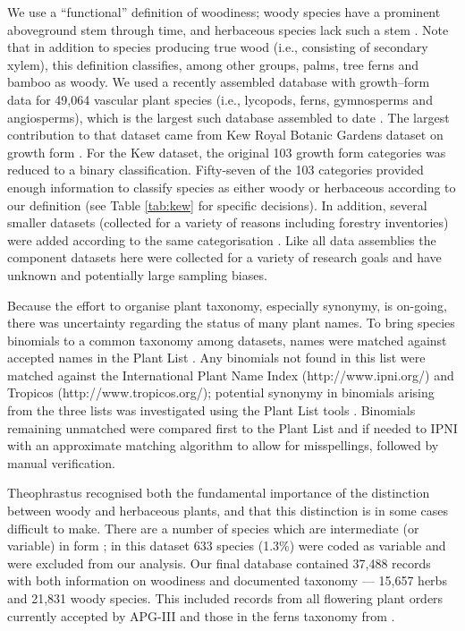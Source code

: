 \documentclass[a4paper,12pt]{article}
\begin{document}
We use a ``functional'' definition of woodiness; woody species have a
prominent aboveground stem through time, and herbaceous species lack
such a stem \citep[see an early use of this definition
by][]{gray1887elements}.  Note that in addition to species producing
true wood (i.e., consisting of secondary xylem), this definition
classifies, among other groups, palms, tree ferns and bamboo as
woody.
%
We used a recently assembled database with growth--form data for 49,064
vascular plant species (i.e., lycopods, ferns,
gymnosperms and angiosperms), which is the largest such database assembled
to date \citep{Zanne}. 
%
The largest contribution to that dataset came from Kew Royal Botanic
Gardens dataset on growth form \citep{Kew}.  For the Kew dataset, the
original 103 growth form categories was reduced to a binary
classification.  Fifty-seven of the 103 categories provided enough
information to classify species as either woody or herbaceous
according to our definition (see Table \ref{tab:kew} for specific
decisions).  In addition, several smaller datasets (collected for a
variety of reasons including forestry inventories) were added
according to the same categorisation \citep{Zanne}.  Like all data
assemblies the component datasets here were collected for a variety of
research goals and have unknown and potentially large sampling biases.

Because the effort to organise plant taxonomy, especially synonymy, is
on-going, there was uncertainty regarding the status of many plant
names.
%
To bring species binomials to a common taxonomy among datasets, names
were matched against accepted names in the Plant List
\citep{ThePlantList}.  Any binomials not found in this list were
matched against the International Plant Name Index
(http://www.ipni.org/) and Tropicos (http://www.tropicos.org/);
potential synonymy in binomials arising from the three lists was
investigated using the Plant List tools \citep{ThePlantList}.  
%
Binomials remaining unmatched were compared first to the Plant List
and if needed to IPNI with an approximate matching algorithm to allow
for misspellings, followed by manual verification.

Theophrastus recognised both the fundamental importance of the
distinction between woody and herbaceous plants, and that this
distinction is in some cases difficult to make.  There are a number of
species which are intermediate (or variable) in form
\citep{beaulieuHiddenRates}; in this dataset 633 species (1.3\%) were
coded as variable and were excluded from our analysis.
%
Our final database contained 37,488 records with both information on
woodiness and documented taxonomy --- 15,657 herbs and 21,831 woody
species.  This included records from all flowering plant orders
currently accepted by APG-III \citep{APG3} and those in the ferns
taxonomy from \citet{apweb}.
\end{document}
